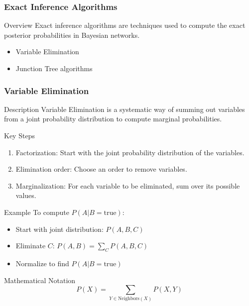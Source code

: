 \documentclass[aspectratio=169]{beamer}
\begin{document}
\begin{frame}[fragile]
    \frametitle{Exact Inference Algorithms}
    \begin{block}{Overview}
        Exact inference algorithms are techniques used to compute the exact posterior probabilities in Bayesian networks.
        \begin{itemize}
            \item Variable Elimination
            \item Junction Tree algorithms
        \end{itemize}
    \end{block}
\end{frame}

\begin{frame}[fragile]
    \frametitle{Variable Elimination}
    \begin{block}{Description}
        Variable Elimination is a systematic way of summing out variables from a joint probability distribution to compute marginal probabilities.
    \end{block}

    \begin{block}{Key Steps}
        \begin{enumerate}
            \item Factorization: Start with the joint probability distribution of the variables.
            \item Elimination order: Choose an order to remove variables.
            \item Marginalization: For each variable to be eliminated, sum over its possible values.
        \end{enumerate}
    \end{block}

    \begin{block}{Example}
        To compute \( P(A | B = \text{true}) \):
        \begin{itemize}
            \item Start with joint distribution: \( P(A, B, C) \)
            \item Eliminate \( C \): \( P(A, B) = \sum_C P(A, B, C) \)
            \item Normalize to find \( P(A | B = \text{true}) \)
        \end{itemize}
    \end{block}

    \begin{block}{Mathematical Notation}
        \begin{equation}
            P(X) = \sum_{Y \in \text{Neighbors}(X)} P(X, Y)
        \end{equation}
    \end{block}
\end{frame}
\end{document}
